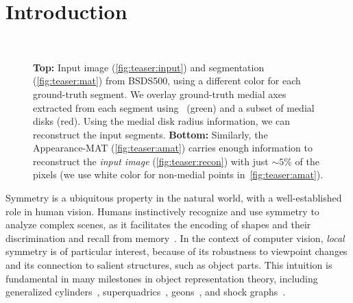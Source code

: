 \documentclass[10pt,twocolumn,letterpaper]{article}
\begin{document}
\section{Introduction}\label{sec:introduction}
\begin{figure}[!t]
\centering
{}
 \\
\caption{\textbf{Top:} Input image (\ref{fig:teaser:input}) and segmentation (\ref{fig:teaser:mat}) from BSDS500,
using a different color for each ground-truth segment. 
We overlay ground-truth medial axes extracted from each segment using~\cite{telea2002augmented} (green) and a subset of medial disks (red). 
Using the medial disk radius information, we can reconstruct the input segments. 
\textbf{Bottom:} Similarly, the Appearance-MAT (\ref{fig:teaser:amat}) carries enough information to reconstruct the 
 \emph{input image} (\ref{fig:teaser:recon}) with just $\sim 5\%$ of the pixels 
 (we use white color for non-medial points in~\ref{fig:teaser:amat}).}
\label{fig:teaser}
\end{figure}

Symmetry is a ubiquitous property in the natural world, with a well-established role in human vision.
Humans instinctively recognize and use symmetry to analyze complex scenes, as it facilitates the encoding of shapes and
their discrimination and recall from memory~\cite{barlow1979versatility,royer1981detection,wagemans1998parallel}.
In the context of computer vision, \emph{local} symmetry is of particular interest, 
because of its robustness to viewpoint changes and its connection to salient structures, such as object parts.
This intuition is fundamental in many milestones in object representation theory, including generalized
cylinders~\cite{binford1971visual}, superquadrics~\cite{barr1981superquadrics}, 
geons~\cite{biederman1987recognition}, and shock graphs~\cite{siddiqi1999shock}.
\end{document}
